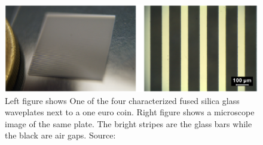 \begin{figure}
    \centering
    \includegraphics[scale=0.45]{images/3_chapter03/SLE_waveplate_JO_.png}
    \caption{Left figure shows One of the four characterized fused silica glass waveplates next to a one euro coin. Right figure shows a microscope image of the same plate. The bright stripes are the glass bars while the black are air gaps. Source: \cite{Ornik2018HighPlatesb}}
    \label{fig:SLE_waveplate_JO_}
\end{figure}

